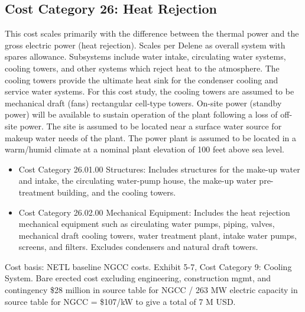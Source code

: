\subsection{Cost Category 26: Heat Rejection} 

This cost scales primarily with the difference between the thermal power and the gross electric power (heat rejection). Scales per Delene as overall system with spares allowance.  Subsystems include water intake, circulating water systems, cooling towers, and other systems which reject heat to the atmosphere. The cooling towers provide the ultimate heat sink for the condenser cooling and service water systems.  For this cost study, the cooling towers are assumed to be mechanical draft (fans) rectangular cell-type towers.  On-site power (standby power) will be available to sustain operation of the plant following a loss of off-site power. The site is assumed to be located near a surface water source for makeup water needs of the plant.  The power plant is assumed to be located in a warm/humid climate at a nominal plant elevation of 100 feet above sea level.  

\begin{itemize}
    \item Cost Category 26.01.00 Structures: Includes structures for the make-up water and intake, the circulating water-pump house, the make-up water pre-treatment building, and the cooling towers.
    \item Cost Category 26.02.00 Mechanical Equipment: Includes the heat rejection mechanical equipment such as circulating water pumps, piping, valves, mechanical draft cooling towers, water treatment plant, intake water pumps, screens, and filters. Excludes condensers and natural draft towers.
\end{itemize}

Cost basis: NETL baseline NGCC costs. Exhibit 5-7, Cost Category 9: Cooling System. Bare erected cost excluding engineering, construction mgmt, and contingency \$28 million in source table for NGCC / 263 MW electric capacity in source table for NGCC = \$107/kW to give a total of 7 M USD.








